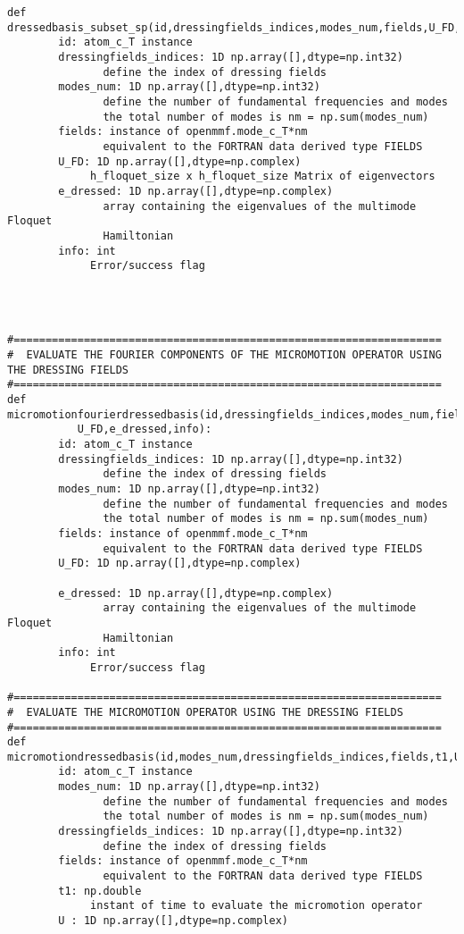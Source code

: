 \documentclass[10pt,a4paper]{article}
\begin{document}
\begin{verbatim}
def dressedbasis_subset_sp(id,dressingfields_indices,modes_num,fields,U_FD,e_dressed,info):
        id: atom_c_T instance
        dressingfields_indices: 1D np.array([],dtype=np.int32)
               define the index of dressing fields
        modes_num: 1D np.array([],dtype=np.int32)
               define the number of fundamental frequencies and modes
               the total number of modes is nm = np.sum(modes_num)
        fields: instance of openmmf.mode_c_T*nm 
               equivalent to the FORTRAN data derived type FIELDS
        U_FD: 1D np.array([],dtype=np.complex)
             h_floquet_size x h_floquet_size Matrix of eigenvectors            
        e_dressed: 1D np.array([],dtype=np.complex)
               array containing the eigenvalues of the multimode Floquet
               Hamiltonian
        info: int
             Error/success flag


     

#===================================================================
#  EVALUATE THE FOURIER COMPONENTS OF THE MICROMOTION OPERATOR USING THE DRESSING FIELDS
#===================================================================
def micromotionfourierdressedbasis(id,dressingfields_indices,modes_num,fields,
           U_FD,e_dressed,info):
        id: atom_c_T instance
        dressingfields_indices: 1D np.array([],dtype=np.int32)
               define the index of dressing fields
        modes_num: 1D np.array([],dtype=np.int32)
               define the number of fundamental frequencies and modes
               the total number of modes is nm = np.sum(modes_num)
        fields: instance of openmmf.mode_c_T*nm 
               equivalent to the FORTRAN data derived type FIELDS
        U_FD: 1D np.array([],dtype=np.complex)
              
        e_dressed: 1D np.array([],dtype=np.complex)
               array containing the eigenvalues of the multimode Floquet
               Hamiltonian
        info: int
             Error/success flag

#===================================================================
#  EVALUATE THE MICROMOTION OPERATOR USING THE DRESSING FIELDS
#===================================================================
def micromotiondressedbasis(id,modes_num,dressingfields_indices,fields,t1,U,info):
        id: atom_c_T instance
        modes_num: 1D np.array([],dtype=np.int32)
               define the number of fundamental frequencies and modes
               the total number of modes is nm = np.sum(modes_num)
        dressingfields_indices: 1D np.array([],dtype=np.int32)
               define the index of dressing fields
        fields: instance of openmmf.mode_c_T*nm 
               equivalent to the FORTRAN data derived type FIELDS
        t1: np.double
             instant of time to evaluate the micromotion operator
        U : 1D np.array([],dtype=np.complex)
             

\end{verbatim}
\end{document}
